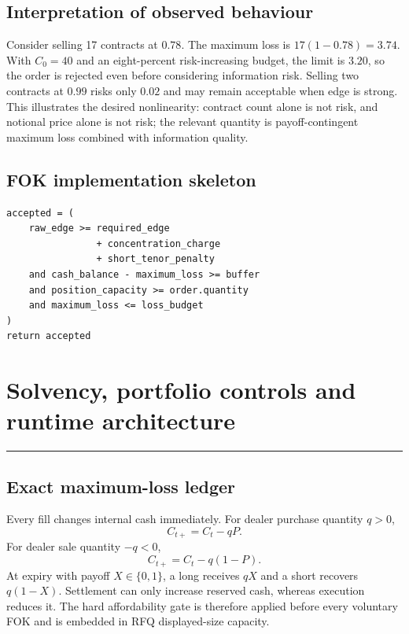 \documentclass[10pt,a4paper]{article}
\newcommand{\1}{\mathbf{1}}
\newcommand{\sectionrule}{\vspace{-2pt}\noindent\color{navy}\rule{\textwidth}{0.7pt}\color{black}\vspace{2pt}}
\begin{document}
\subsection{Interpretation of observed behaviour}
Consider selling 17 contracts at $0.78$.  The maximum loss is
$17(1-0.78)=3.74$.  With $C_0=40$ and an eight-percent risk-increasing budget, the
limit is $3.20$, so the order is rejected even before considering information risk.
Selling two contracts at $0.99$ risks only $0.02$ and may remain acceptable when edge
is strong.  This illustrates the desired nonlinearity: contract count alone is not
risk, and notional price alone is not risk; the relevant quantity is payoff-contingent
maximum loss combined with information quality.

\subsection{FOK implementation skeleton}
\begin{lstlisting}
accepted = (
    raw_edge >= required_edge
                + concentration_charge
                + short_tenor_penalty
    and cash_balance - maximum_loss >= buffer
    and position_capacity >= order.quantity
    and maximum_loss <= loss_budget
)
return accepted
\end{lstlisting}

\clearpage

\section{Solvency, portfolio controls and runtime architecture}
\sectionrule

\subsection{Exact maximum-loss ledger}
Every fill changes internal cash immediately.  For dealer purchase quantity $q>0$,
\[
 C_{t+}=C_t-qP.
\]
For dealer sale quantity $-q<0$,
\[
 C_{t+}=C_t-q(1-P).
\]
At expiry with payoff $X\in\{0,1\}$, a long receives $qX$ and a short recovers
$q(1-X)$.  Settlement can only increase reserved cash, whereas execution reduces it.
The hard affordability gate is therefore applied before every voluntary FOK and is
embedded in RFQ displayed-size capacity.
\end{document}

